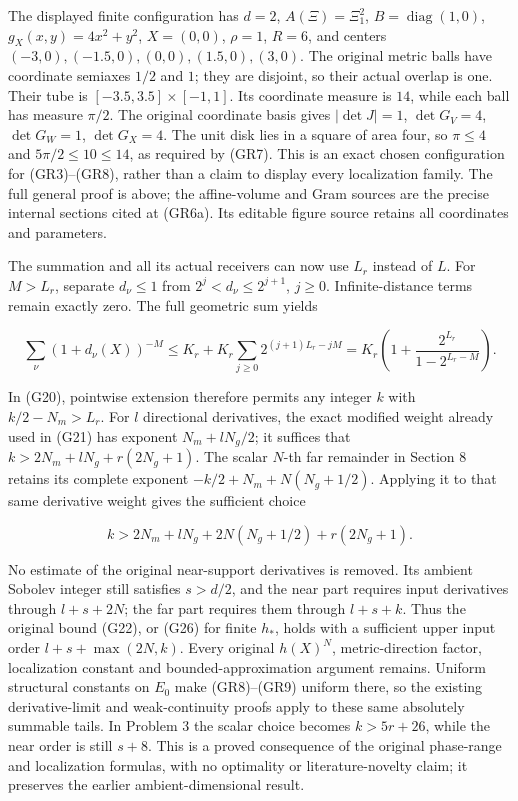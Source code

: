\documentclass[
  11pt,
]{article}
\begin{document}
The displayed finite configuration has \(d=2\), \(A(\Xi)=\Xi_1^2\),
\(B=\operatorname{diag}(1,0)\), \(g_X(x,y)=4x^2+y^2\), \(X=(0,0)\),
\(\rho=1\), \(R=6\), and centers
\((-3,0),(-1.5,0),(0,0),(1.5,0),(3,0)\). The original metric balls have
coordinate semiaxes \(1/2\) and \(1\); they are disjoint, so their
actual overlap is one. Their tube is \([-3.5,3.5]\times[-1,1]\). Its
coordinate measure is \(14\), while each ball has measure \(\pi/2\). The
original coordinate basis gives \(|\det J|=1\), \(\det G_V=4\),
\(\det G_W=1\), \(\det G_X=4\). The unit disk lies in a square of area
four, so \(\pi\leq4\) and \(5\pi/2\leq10\leq14\), as required by (GR7).
This is an exact chosen configuration for (GR3)--(GR8), rather than a
claim to display every localization family. The full general proof is
above; the affine-volume and Gram sources are the precise internal
sections cited at (GR6a). Its editable figure source retains all
coordinates and parameters.

The summation and all its actual receivers can now use \(L_r\) instead
of \(L\). For \(M>L_r\), separate \(d_\nu\leq1\) from
\(2^j<d_\nu\leq2^{j+1}\), \(j\geq0\). Infinite-distance terms remain
exactly zero. The full geometric sum yields

\[
\sum_\nu(1+d_\nu(X))^{-M}
\leq K_r+K_r\sum_{j\geq0}2^{(j+1)L_r-jM}
=K_r\left(1+\frac{2^{L_r}}{1-2^{L_r-M}}\right).
\tag{GR9}
\]

In (G20), pointwise extension therefore permits any integer \(k\) with
\(k/2-N_m>L_r\). For \(l\) directional derivatives, the exact modified
weight already used in (G21) has exponent \(N_m+lN_g/2\); it suffices
that \(k>2N_m+lN_g+r(2N_g+1)\). The scalar \(N\)-th far remainder in
Section 8 retains its complete exponent \(-k/2+N_m+N(N_g+1/2)\).
Applying it to that same derivative weight gives the sufficient choice

\[
k>2N_m+lN_g+2N(N_g+1/2)+r(2N_g+1).
\tag{GR10}
\]

No estimate of the original near-support derivatives is removed. Its
ambient Sobolev integer still satisfies \(s>d/2\), and the near part
requires input derivatives through \(l+s+2N\); the far part requires
them through \(l+s+k\). Thus the original bound (G22), or (G26) for
finite \(h_*\), holds with a sufficient upper input order
\(l+s+\max(2N,k)\). Every original \(h(X)^N\), metric-direction factor,
localization constant and bounded-approximation argument remains.
Uniform structural constants on \(E_0\) make (GR8)--(GR9) uniform there,
so the existing derivative-limit and weak-continuity proofs apply to
these same absolutely summable tails. In Problem 3 the scalar choice
becomes \(k>5r+26\), while the near order is still \(s+8\). This is a
proved consequence of the original phase-range and localization
formulas, with no optimality or literature-novelty claim; it preserves
the earlier ambient-dimensional result.
\end{document}

